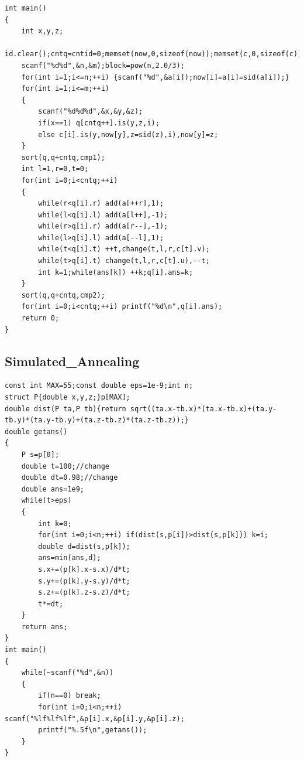 \documentclass[twoside]{article}
\begin{document}
\begin{lstlisting}
int main()
{
    int x,y,z;
    id.clear();cntq=cntid=0;memset(now,0,sizeof(now));memset(c,0,sizeof(c));
    scanf("%d%d",&n,&m);block=pow(n,2.0/3);
    for(int i=1;i<=n;++i) {scanf("%d",&a[i]);now[i]=a[i]=sid(a[i]);}
    for(int i=1;i<=m;++i)
    {
        scanf("%d%d%d",&x,&y,&z);
        if(x==1) q[cntq++].is(y,z,i);
        else c[i].is(y,now[y],z=sid(z),i),now[y]=z;
    }
    sort(q,q+cntq,cmp1);
    int l=1,r=0,t=0;
    for(int i=0;i<cntq;++i)
    {
        while(r<q[i].r) add(a[++r],1);
        while(l<q[i].l) add(a[l++],-1);
        while(r>q[i].r) add(a[r--],-1);
        while(l>q[i].l) add(a[--l],1);
        while(t<q[i].t) ++t,change(t,l,r,c[t].v);
        while(t>q[i].t) change(t,l,r,c[t].u),--t;
        int k=1;while(ans[k]) ++k;q[i].ans=k;
    }
    sort(q,q+cntq,cmp2);
    for(int i=0;i<cntq;++i) printf("%d\n",q[i].ans);
    return 0;
}
\end{lstlisting}
\subsection{Simulated_Annealing}
\begin{lstlisting}
const int MAX=55;const double eps=1e-9;int n;
struct P{double x,y,z;}p[MAX];
double dist(P ta,P tb){return sqrt((ta.x-tb.x)*(ta.x-tb.x)+(ta.y-tb.y)*(ta.y-tb.y)+(ta.z-tb.z)*(ta.z-tb.z));}
double getans()
{
    P s=p[0];
    double t=100;//change
    double dt=0.98;//change
    double ans=1e9;
    while(t>eps)
    {
        int k=0;
        for(int i=0;i<n;++i) if(dist(s,p[i])>dist(s,p[k])) k=i;
        double d=dist(s,p[k]);
        ans=min(ans,d);
        s.x+=(p[k].x-s.x)/d*t;
        s.y+=(p[k].y-s.y)/d*t;
        s.z+=(p[k].z-s.z)/d*t;
        t*=dt;
    }
    return ans;
}
int main()
{
    while(~scanf("%d",&n))
    {
        if(n==0) break;
        for(int i=0;i<n;++i) scanf("%lf%lf%lf",&p[i].x,&p[i].y,&p[i].z);
        printf("%.5f\n",getans());
    }
}
\end{lstlisting}
\end{document}
